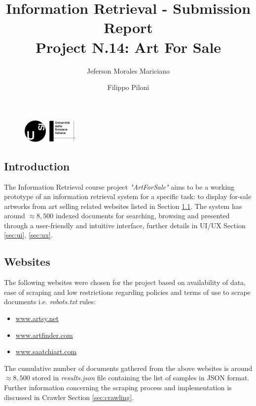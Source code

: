 \documentclass[12pt]{spieman}  %
\title{Information Retrieval - Submission Report \\Project N.14: Art For Sale}
\author{Jeferson Morales Mariciano}
\author{Filippo Piloni}
\affil{Università della Svizzera italiana, Faculty of Informatics, Lugano, Switzerland}
\begin{document}
\begin{figure}
    \includegraphics[width=0.25\textwidth, trim={0cm 0cm 0cm 7cm}]{USI_logo.png}
\end{figure}

\maketitle
\tableofcontents
\newpage

\begin{spacing}{1}   %

    \section{Introduction}
    The Information Retrieval course project \textit{"ArtForSale"} aims to be a working prototype of an information
    retrieval system for a specific task: to display for-sale artworks from art selling related websites
    listed in Section \ref{sec:websites}.
    The system has around $\approx 8,500$ indexed documents for searching, browsing and presented through a
    user-friendly and intuitive interface, further details in UI/UX Section \ref{sec:ui}, \ref{sec:ux}.

    \subsection{Websites}\label{sec:websites}
    The following websites were chosen for the project based on availability of data, ease of scraping and
    low restrictions regarding policies and terms of use to scrape documents i.e. \textit{robots.txt} rules:

    \begin{itemize}
        \item \url{www.artsy.net}
        \item \url{www.artfinder.com}
        \item \url{www.saatchiart.com}
    \end{itemize}

    The cumulative number of documents gathered from the above websites is around $\approx 8,500$ stored in
    \textit{results.json} file containing the list of samples in JSON format.
    Further information concerning the scraping process and implementation is discussed
    in Crawler Section \ref{sec:crawling}.


\end{spacing}
\end{document}
